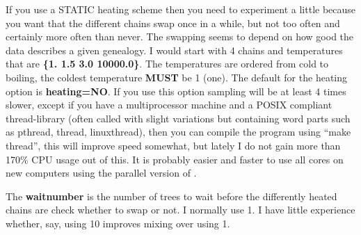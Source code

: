 \begin{description}
If you use a STATIC heating scheme then you need to experiment a little because you want that the different
chains swap once in a while, but not too often and certainly more often
than never. The swapping seems to depend on how good the data describes a 
given genealogy. I would start with 4 chains and 
temperatures that are \textbf{ \{1. 1.5 3.0 10000.0\}}. 
The temperatures are ordered 
from cold to boiling, the coldest temperature \textbf{ MUST} be 1 (one).
The default for the heating option is \textbf{ heating=NO}. If you use
this option sampling will be at least 4 times slower, except 
if you have a multiprocessor machine and a POSIX compliant thread-library
(often called with slight variations but containing word parts such 
as pthread, thread, linuxthread), 
then you can compile the program using ``make thread'',  this will improve speed somewhat, but lately I do not gain more than 170\% CPU usage out of this. It is probably easier and faster to use all cores on new computers using the parallel version of \migrate.

The \textbf{ waitnumber} is the number of trees to wait before the differently heated chains are check whether to swap or not. I normally use 1. I have little experience whether, say, using 10 improves mixing over using 1.
\end{description}

